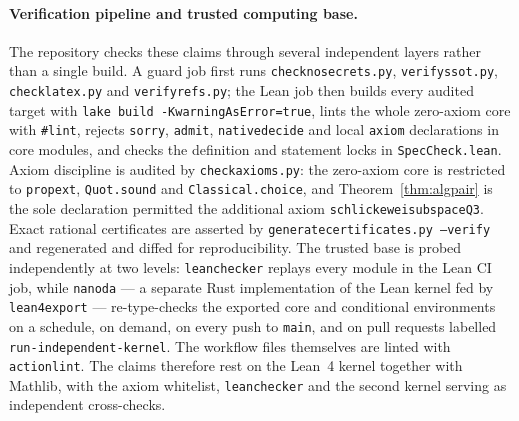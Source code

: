 \documentclass[11pt,a4paper]{article}
\theoremstyle{remark}
\renewcommand{\_}{\textunderscore\allowbreak}
\newcommand{\lean}[1]{\texttt{#1}}
\begin{document}
\paragraph{Verification pipeline and trusted computing base.}
The repository checks these claims through several independent layers rather than a single build. A guard job first runs \lean{check\_no\_secrets.py}, \lean{verify\_ssot.py}, \lean{check\_latex.py} and \lean{verify\_refs.py}; the Lean job then builds every audited target with \lean{lake build -KwarningAsError=true}, lints the whole zero-axiom core with \lean{\#lint}, rejects \lean{sorry}, \lean{admit}, \lean{native\_decide} and local \lean{axiom} declarations in core modules, and checks the definition and statement locks in \lean{SpecCheck.lean}. Axiom discipline is audited by \lean{check\_axioms.py}: the zero-axiom core is restricted to \lean{propext}, \lean{Quot.sound} and \lean{Classical.choice}, and Theorem~\ref{thm:algpair} is the sole declaration permitted the additional axiom \lean{schlickewei\_subspace\_Q3}. Exact rational certificates are asserted by \lean{generate\_certificates.py --verify} and regenerated and diffed for reproducibility. The trusted base is probed independently at two levels: \lean{leanchecker} replays every module in the Lean CI job, while \lean{nanoda} --- a separate Rust implementation of the Lean kernel fed by \lean{lean4export} --- re-type-checks the exported core and conditional environments on a schedule, on demand, on every push to \lean{main}, and on pull requests labelled \lean{run-independent-kernel}. The workflow files themselves are linted with \lean{actionlint}. The claims therefore rest on the Lean~4 kernel together with Mathlib, with the axiom whitelist, \lean{leanchecker} and the second kernel serving as independent cross-checks.
\end{document}
